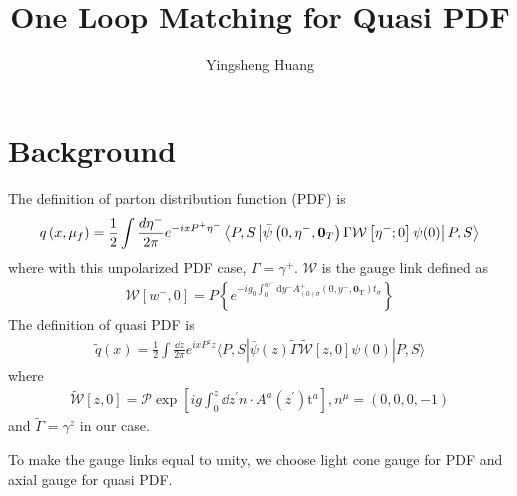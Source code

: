 \documentclass{article}
\title{One Loop Matching for Quasi PDF}
\author{Yingsheng Huang}
\begin{document}
\maketitle
\clearpage
\section{Background}
The definition of parton distribution function (PDF) is
\begin{align}
	q\left(x, \mu_{f}\right)=\frac{1}{2} \int \frac{d \eta^{-}}{2 \pi} e^{-i x P^{+} \eta^{-}}\left\langle P, S\left|\bar{\psi}\left(0,\eta^{-},\vb{0}_{T}\right) \Gamma \mathcal{W}\left[\eta^{-} ; 0\right] \psi(0)\right| P, S\right\rangle
\end{align}
where with this unpolarized PDF case, $\Gamma=\gamma^+$. $\mathcal{W}$ is the gauge link defined as\cite{Collins2009}
\begin{align}
	\mathcal{W}\left[w^{-}, 0\right]=P\left\{e^{-i g_{0} \int_{0}^{w^{-}} \mathrm{d} y^{-} A_{(0) \sigma}^{+}\left(0, y^{-}, \boldsymbol{0}_{\mathrm{T}}\right) t_{\sigma}}\right\}
\end{align}
The definition of quasi PDF is
\begin{align}
	\tilde{q}(x)=\frac{1}{2} \int \frac{\dd z}{2 \pi} e^{i x P^{z} z}\langle P, S|\bar{\psi}(z) \tilde{\Gamma} \tilde{\mathcal{W}}[z, 0] \psi(0)| P, S\rangle
\end{align}
where
\begin{align}
	\tilde{\mathcal{W}}\left[z, 0\right]=\mathcal{P} \exp \left[i g \int_{0}^{z} \dd z^{\prime} n \cdot A^{a}\left(z^{\prime}\right) \mathrm{t}^{a}\right], n^\mu=(0,0,0,-1)
\end{align}
and $\tilde{\Gamma}=\gamma^z$ in our case.

To make the gauge links equal to unity, we choose light cone gauge for PDF and axial gauge for quasi PDF.

\clearpage
\end{document}
